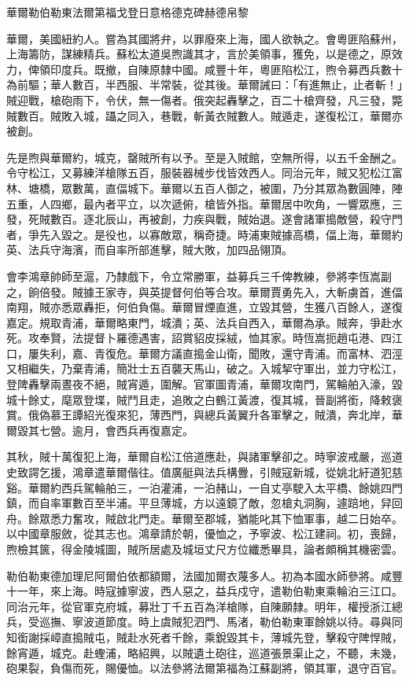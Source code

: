 
\begin{pinyinscope}
華爾勒伯勒東法爾第福戈登日意格德克碑赫德帛黎

華爾，美國紐約人。嘗為其國將弁，以罪廢來上海，國人欲執之。會粵匪陷蘇州，上海籌防，謀練精兵。蘇松太道吳煦識其才，言於美領事，獲免，以是德之，原效力，俾領印度兵。既撤，自陳原隸中國。咸豐十年，粵匪陷松江，煦令募西兵數十為前驅；華人數百，半西服、半常裝，從其後。華爾誡曰：「有進無止，止者斬！」賊迎戰，槍砲雨下，令伏，無一傷者。俄突起轟擊之，百二十槍齊發，凡三發，斃賊數百。賊敗入城，躡之同入，巷戰，斬黃衣賊數人。賊遁走，遂復松江，華爾亦被創。

先是煦與華爾約，城克，罄賊所有以予。至是入賊館，空無所得，以五千金酬之。令守松江，又募練洋槍隊五百，服裝器械步伐皆效西人。同治元年，賊又犯松江富林、塘橋，眾數萬，直偪城下。華爾以五百人御之，被圍，乃分其眾為數圓陣，陣五重，人四鄉，最內者平立，以次遞俯，槍皆外指。華爾居中吹角，一響眾應，三發，死賊數百。逐北辰山，再被創，力疾與戰，賊始退。遂會諸軍搗敵營，殺守門者，爭先入毀之。是役也，以寡敵眾，稱奇捷。時浦東賊據高橋，偪上海，華爾約英、法兵守海濱，而自率所部進擊，賊大敗，加四品翎頂。

會李鴻章帥師至滬，乃隸戲下，令立常勝軍，益募兵三千俾教練，參將李恆嵩副之，餉倍發。賊據王家寺，與英提督何伯等合攻。華爾賈勇先入，大斬虜首，進偪南翔，賊亦悉眾轟拒，何伯負傷。華爾冒煙直進，立毀其營，生獲八百餘人，遂復嘉定。規取青浦，華爾略東門，城潰；英、法兵自西入，華爾為承。賊奔，爭赴水死。攻奉賢，法提督卜羅德遇害，詔賞貂皮採絨，恤其家。時恆嵩扼趙屯港、四江口，屢失利，嘉、青復危。華爾方議直搗金山衛，聞敗，還守青浦。而富林、泗涇又相繼失，乃棄青浦，簡壯士五百襲天馬山，破之。入城挈守軍出，並力守松江，登陴轟擊兩晝夜不絕，賊宵遁，圍解。官軍圖青浦，華爾攻南門，駕輪舶入濠，毀城十餘丈，麾眾登堞，賊鬥且走，追敗之白鶴江黃渡，復其城，晉副將銜，降敕褒賞。俄偽慕王譚紹光復來犯，薄西門，與總兵黃翼升各軍擊之，賊潰，奔北岸，華爾毀其七營。逾月，會西兵再復嘉定。

其秋，賊十萬復犯上海，華爾自松江倍道應赴，與諸軍擊卻之。時寧波戒嚴，巡道史致諤乞援，鴻章遣華爾偕往。值廣艇與法兵構釁，引賊寇新城，從姚北紆道犯慈谿。華爾約西兵駕輪舶三，一泊灌浦，一泊赭山，一自丈亭駛入太平橋、餘姚四門鎮，而自率軍數百至半浦。平旦薄城，方以遠鏡了敵，忽槍丸洞胸，遽踣地，舁回舟。餘眾悉力奮攻，賊啟北門走。華爾至郡城，猶能叱其下恤軍事，越二日始卒。以中國章服斂，從其志也。鴻章請於朝，優恤之，予寧波、松江建祠。初，喪歸，煦檢其篋，得金陵城圖，賊所居處及城垣丈尺方位纖悉畢具，論者頗稱其機密雲。

勒伯勒東德加理尼阿爾伯依都額爾，法國加爾衣蔑多人。初為本國水師參將。咸豐十一年，來上海。時寇據寧波，西人惡之，益兵戍守，遣勒伯勒東乘輪泊三江口。同治元年，從官軍克府城，募壯丁千五百為洋槍隊，自陳願隸。明年，權授浙江總兵，受巡撫、寧波道節度。時上虞賊犯泗門、馬渚，勒伯勒東軍餘姚以待。尋與同知銜謝採嶂直搗賊屯，賊赴水死者千餘，乘銳毀其卡，薄城先登，擊殺守陴悍賊，餘宵遁，城克。赴蟶浦，略紹興，以賊遺土砲往，巡道張景渠止之，不聽，未幾，砲果裂，負傷而死，賜優恤。以法參將法爾第福為江蘇副將，領其軍，退守百官。


\end{pinyinscope}
